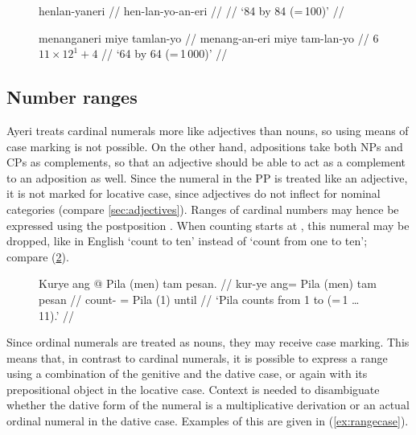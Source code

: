 \begin{figure}[h]
\pex\label{ex:distnuminfl}
\a\begingl
	\gla henlan-yaneri //
	\glb hen-lan-yo-an-eri //
	 //
	\glft `84 by 84 (=\,100)' //
\endgl

\a\begingl
	\gla menanganeri miye tamlan-yo //
	\glb menang-an-eri miye tam-lan-yo //
	 {$6$} {$11 \times 12^1 + 4$} //
	\glft `6\elv{}4 by 6\elv{}4 (=\,1\,000)' //
\endgl
\xe
\end{figure}

\subsection{Number ranges}

Ayeri treats cardinal numerals more like adjectives than nouns, so using means
of case marking is not possible. On the other hand, adpositions take both NPs
and CPs as complements, so that an adjective should be able to act as a
complement to an adposition as well. Since the numeral in the PP is treated
like an adjective, it is not marked for locative case, since adjectives do not
inflect for nominal categories (compare \autoref{sec:adjectives}). Ranges of
cardinal numbers may hence be expressed using the postposition
. When counting starts at ,
this numeral may be dropped, like in English `count to ten' instead of `count
from one to ten'; compare (\ref{ex:numstretch}).

\begin{figure}[h]
\ex\label{ex:numstretch}
\begingl
	\gla Kurye ang @ Pila \textup{(}men\textup{)} tam pesan. //
	\glb kur-ye ang= Pila (men) tam pesan //
	\glc count-\TsgF{} \Aarg{}= Pila (1) \elv{} until //
	\glft `Pila counts from 1 to \elv{} (=\,1 … 11).' //
\endgl
\xe
\end{figure}

Since ordinal numerals are treated as nouns, they may receive case marking.
This means that, in contrast to cardinal numerals, it is possible to express a
range using a combination of the genitive and the dative case, or again
 with its prepositional object in the locative case.
Context is needed to disambiguate whether the dative form of the numeral is a
multiplicative derivation or an actual ordinal numeral in the dative case.
Examples of this are given in (\ref{ex:rangecase}).

